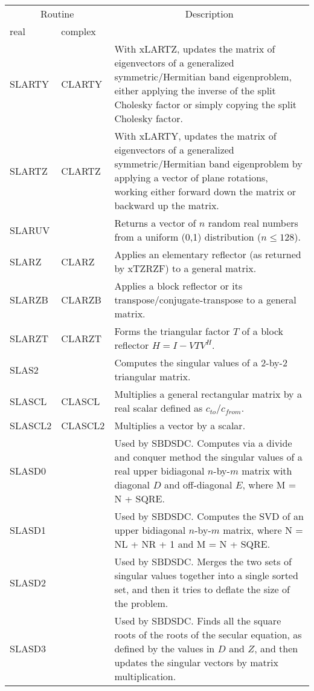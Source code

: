 \begin{center}
\begin{tabular}{| l   p{0.75in} |p{4.5in}    |}
\hline \multicolumn{2}{|c|}{Routine}&\multicolumn{1}{c|}{Description} \\ 
\cline{1-2} real&complex&\\
\hline \hline
SLARTY&CLARTY&
With xLARTZ,
updates the matrix of eigenvectors of a generalized symmetric/Hermitian band eigenproblem,
either applying the inverse of the split Cholesky factor or simply copying the split Cholesky factor.\\
SLARTZ&CLARTZ&
With xLARTY, 
updates the matrix of eigenvectors of a generalized symmetric/Hermitian band eigenproblem 
by applying a vector of plane rotations, 
working either forward down the matrix or backward up the matrix.\\
SLARUV&&
Returns a vector of $n$ random real numbers from a uniform (0,1) distribution 
($n \leq 128$).\\
SLARZ&CLARZ&
Applies an elementary reflector (as returned by xTZRZF) to a general
matrix.\\
SLARZB&CLARZB&
Applies a block reflector or its transpose/conjugate-transpose to a 
general matrix.\\
SLARZT&CLARZT&
Forms the triangular factor $T$ of a block reflector $H = I - V T V^H$.\\
SLAS2&&
Computes the singular values of a 2-by-2 triangular matrix.\\
SLASCL&CLASCL& 
Multiplies a general rectangular matrix by a real scalar defined as
$c_{to}/c_{from}$.\\
SLASCL2&CLASCL2&
Multiplies a vector by a scalar.\\
SLASD0&&
Used by SBDSDC.  Computes via a divide and conquer method the singular values
of a real upper bidiagonal $n$-by-$m$ matrix with diagonal $D$ and off-diagonal
$E$, where M = N + SQRE. \\
SLASD1&&
Used by SBDSDC.  Computes the SVD of an upper bidiagonal $n$-by-$m$ matrix,
where N = NL + NR + 1 and M = N + SQRE. \\
SLASD2&&
Used by SBDSDC.  Merges the two sets of singular values together into a
single sorted set, and then it tries to deflate the size of the problem. \\ 
SLASD3&&
Used by SBDSDC.  Finds all the square roots of the roots of the secular
equation, as defined by the values in $D$ and $Z$, and then
updates the singular vectors by matrix multiplication. \\

\end{tabular}
\end{center}
